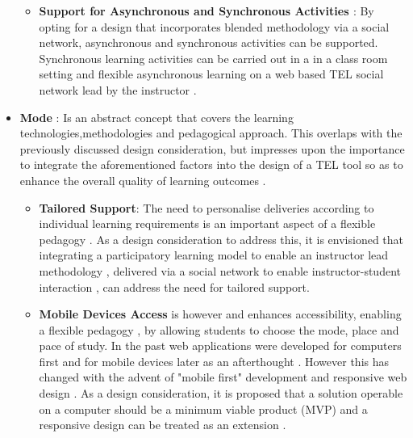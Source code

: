 \begin{itemize}[\null]
\begin{itemize}
\newpage


\item \textbf{Support for Asynchronous and Synchronous Activities \cite{Gordon2014}}: By opting for a design that incorporates blended methodology via a social network, asynchronous and synchronous activities can be supported. Synchronous learning activities can be carried out in a in a class room setting and flexible asynchronous learning on a web based TEL social network lead by the instructor \cite{Gordon2014}.

\end{itemize}

\item \textbf{Mode} : Is an abstract concept that covers the learning technologies,methodologies and pedagogical approach. This overlaps with the previously discussed design consideration, but impresses upon the importance to integrate the aforementioned factors into the design of a TEL tool \cite{Gordon2014} so as to enhance the overall quality of learning outcomes \cite{Cubukcuo2012}.

\begin{itemize}
\item \textbf{Tailored Support}: The need to personalise deliveries according to individual learning requirements is an important aspect of a flexible pedagogy \cite{Gordon2014}. As a design consideration to address this, it is envisioned that  integrating a participatory learning model \cite{Yager1990,Yager2004} to enable an instructor lead methodology \cite{RickReis,Team2008}, delivered via a social network to enable instructor-student interaction \cite{Cubukcuo2012}, can address the need for tailored support.



\item \textbf{Mobile Devices Access} is however  and enhances accessibility, enabling a flexible pedagogy \cite{Gordon2014}, by allowing students to choose the mode, place and pace of study. In the past web applications were  developed for computers first and for mobile devices later as an afterthought \cite{W3.CSS2016}. However this has changed with the advent of "mobile first" development and responsive web design \cite{W3.CSS2016}. As a design consideration, it is proposed that a solution operable on a computer should be a minimum viable product (MVP) and a responsive design can be treated as an extension \cite{W3.CSS2016}.
\end{itemize}
\end{itemize}



